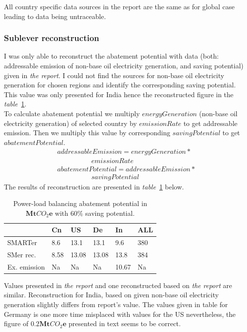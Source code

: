 \documentclass[11pt, twocolumn]{article}
\begin{document}
All country specific data sources in the report are the same as for global case leading to data being untraceable.

\subsubsection{Sublever reconstruction\label{sec:plb:reconstruction}}
I was only able to reconstruct the abatement potential with data (both: addressable emission of non-base oil electricity generation, and saving potential) given in \emph{the report}. I could not find the sources for non-base oil electricity generation for chosen regions and identify the corresponding saving potential. This value was only presented for India hence the reconstructed figure in the \emph{table}~\ref{tab:plb}.\\

To calculate abatement potential we multiply $energyGeneration$ (non-base oil electricity generation) of selected country by $emissionRate$ to get addressable emission. Then we multiply this value by corresponding $savingPotential$ to get $abatementPotential$.
\begin{gather*}
  addressableEmission = energyGeneration *\\
  \quad\quad\quad\quad\quad emissionRate\\
  abatementPotential = addressableEmission *\\
  \quad\quad\quad\quad\quad savingPotential
\end{gather*}
The results of reconstruction are presented in \emph{table}~\ref{tab:plb} below.
\begin{center}
  \begin{table}[h]
    \begin{tabular}{ p{} | p{} | p{} | p{} | p{} | p{} }
       & Cn & US & De & In & ALL \\
      \hline
      SMARTer & 8.6 & 13.1 & 13.1 & 9.6 & 380 \\
      SMer rec. & 8.58 & 13.08 & 13.08 & 13.8 & 384 \\
      Ex. emission & Na & Na & Na & 10.67 & Na
    \end{tabular}
    \caption{Power-load balancing abatement potential in $\mathbf{Mt}CO_2\mathbf{e}$ with 60\% saving potential. \label{tab:plb}}
  \end{table}
\end{center}

Values presented in \emph{the report} and one reconstructed based on \emph{the report} are similar. Reconstruction for India, based on given non-base oil electricity generation slightly differs from report's value. The values given in table for Germany is one more time misplaced with values for the US nevertheless, the figure of $\mathbf{0.2} \mathbf{Mt}CO_2\mathbf{e}$ presented in text seems to be correct.
\end{document}
